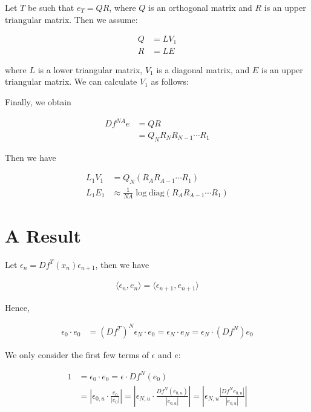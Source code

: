 \documentclass{article}
\begin{document}
Let $T$ be such that $e_T=QR$, where $Q$ is an orthogonal matrix and $R$ is an upper triangular matrix. Then we assume:

\begin{align}
    Q &= LV_1 \\
    R &= LE
\end{align}

where $L$ is a lower triangular matrix, $V_1$ is a diagonal matrix, and $E$ is an upper triangular matrix. We can calculate $V_1$ as follows:

Finally, we obtain

\begin{align}
    Df^{NA}e &= QR \\
    &= Q_NR_NR_{N-1}\cdots R_1
\end{align}

Then we have

\begin{align}
    L_1V_1 &= Q_N(R_AR_{A-1}\cdots R_1) \\
    L_1E_1 &\approx \frac{1}{NA} \log \text{diag}(R_A R_{A-1}\cdots R_1)
\end{align}

\section*{A Result}

Let $\epsilon_n = Df^T(x_n)\epsilon_{n+1}$, then we have

\begin{align}
    \langle \epsilon_n , e_n \rangle = \langle \epsilon_{n+1} , e_{n+1} \rangle
\end{align}

Hence,

\begin{align}
    \epsilon_0 \cdot e_0 &= (Df^T)^N \epsilon_N \cdot e_0 = \epsilon_N \cdot e_N = \epsilon_N \cdot (Df^N)e_0
\end{align}

We only consider the first few terms of $\epsilon$ and $e$:

\begin{align}
    1 &= \epsilon_0 \cdot e_0 = \epsilon \cdot Df^N(e_0) \\
    &= |\epsilon_{0,u} \cdot \frac{e_0}{|e_0|}| = |\epsilon_{N,u} \cdot \frac{Df^N(e_{0,u})}{|e_{0,u}|}| = |\epsilon_{N,u} \frac{|Df^N{e_{0,u}}|}{|e_{0,u}|}|
\end{align}
\end{document}
